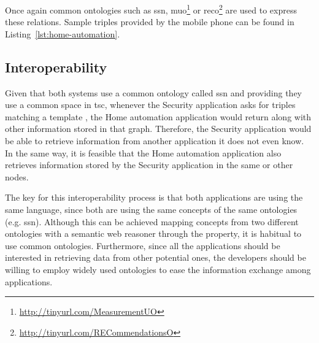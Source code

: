 Once again common ontologies such as \ac{ssn},
\ac{muo}\footnote{\url{http://tinyurl.com/MeasurementUO}} or
\ac{reco}\footnote{\url{http://tinyurl.com/RECommendationsO}} are used to express these relations.
Sample triples provided by the mobile phone can be found in Listing~\ref{lst:home-automation}.


\subsection{Interoperability}

\begin{sloppypar}
Given that both systems use a common ontology called \ac{ssn} and providing they use a common space in \ac{tsc},
whenever the Security application asks for triples matching a template ,
the Home automation application would return  along with other information stored in that graph.
Therefore, the Security application would be able to retrieve information from another application it does not even know.
In the same way, it is feasible that the Home automation application also retrieves information stored by the Security application in the same or other nodes.
\end{sloppypar}

The key for this interoperability process is that both applications are using the same language, since both are using the same concepts of the same ontologies (e.g. \ac{ssn}).
Although this can be achieved mapping concepts from two different ontologies with a semantic web reasoner through the  property, it is habitual to use common ontologies.
Furthermore, since all the applications should be interested in retrieving data from other potential ones, the developers should be willing to employ widely used ontologies to ease the information exchange among applications.